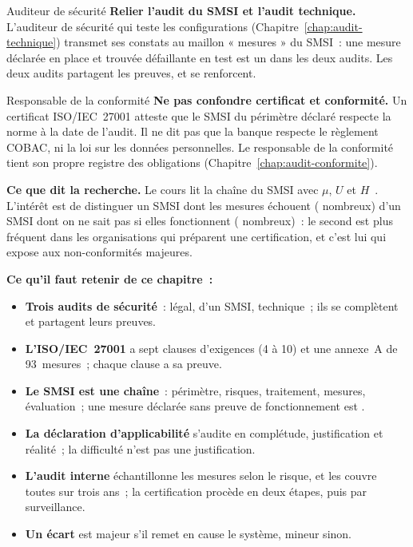 \begin{boxmetier}{Auditeur de sécurité}
\textbf{Relier l'audit du SMSI et l'audit technique.} L'auditeur de
sécurité qui teste les configurations (Chapitre~\ref{chap:audit-technique})
transmet ses constats au maillon « mesures » du SMSI~: une mesure
déclarée en place et trouvée défaillante en test est un \NON{} dans les
deux audits. Les deux audits partagent les preuves, et se renforcent.
\end{boxmetier}

\begin{boxmetier}{Responsable de la conformité}
\textbf{Ne pas confondre certificat et conformité.} Un certificat
ISO/IEC~27001 atteste que le SMSI du périmètre déclaré respecte la norme à
la date de l'audit. Il ne dit pas que la banque respecte le règlement
COBAC, ni la loi sur les données personnelles. Le responsable de la
conformité tient son propre registre des obligations
(Chapitre~\ref{chap:audit-conformite}).
\end{boxmetier}

\begin{boxinfo}
\textbf{Ce que dit la recherche.} Le cours lit la chaîne du SMSI avec
$\mu$, $U$ et $H$~\cite{minka2026nek}. L'intérêt est de distinguer un SMSI
dont les mesures échouent (\NON{} nombreux) d'un SMSI dont on ne sait pas si
elles fonctionnent (\NEK{} nombreux)~: le second est plus fréquent dans les
organisations qui préparent une certification, et c'est lui qui expose aux
non-conformités majeures.
\end{boxinfo}

\separateur

\begin{boxresume}
\textbf{Ce qu'il faut retenir de ce chapitre~:}
\begin{itemize}
    \item \textbf{Trois audits de sécurité}~: légal, d'un SMSI, technique~;
          ils se complètent et partagent leurs preuves.
    \item \textbf{L'ISO/IEC~27001} a sept clauses d'exigences (4 à 10) et une
          annexe~A de 93~mesures~; chaque clause a sa preuve.
    \item \textbf{Le SMSI est une chaîne}~: périmètre, risques, traitement,
          mesures, évaluation~; une mesure déclarée sans preuve de
          fonctionnement est \NEK{}.
    \item \textbf{La déclaration d'applicabilité} s'audite en complétude,
          justification et réalité~; la difficulté n'est pas une
          justification.
    \item \textbf{L'audit interne} échantillonne les mesures selon le risque,
          et les couvre toutes sur trois ans~; la certification procède en
          deux étapes, puis par surveillance.
    \item \textbf{Un écart} est majeur s'il remet en cause le système,
          mineur sinon.
\end{itemize}
\end{boxresume}

